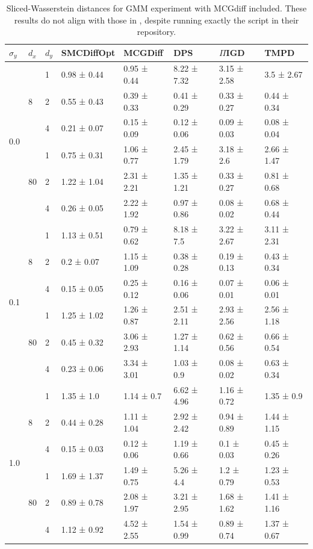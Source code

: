\begin{table}[ht]
    \centering
    \begin{tabular}{llllllll}
        \toprule
        $\sigma_y$ & $d_x$ & $d_y$ & SMCDiffOpt & MCGDiff & DPS & $\Pi$IGD & TMPD \\
        \midrule
        \multirow[t]{6}{*}{0.0} & \multirow[t]{3}{*}{8} & 1 & 0.98 ± 0.44 & 0.95 ± 0.44 & 8.22 ± 7.32 & 3.15 ± 2.58 & 3.5 ± 2.67 \\
         &  & 2 & 0.55 ± 0.43 & 0.39 ± 0.33 & 0.41 ± 0.29 & 0.33 ± 0.27 & 0.44 ± 0.34 \\
         &  & 4 & 0.21 ± 0.07 & 0.15 ± 0.09 & 0.12 ± 0.06 & 0.09 ± 0.03 & 0.08 ± 0.04 \\
        \cline{2-8}
         & \multirow[t]{3}{*}{80} & 1 & 0.75 ± 0.31 & 1.06 ± 0.77 & 2.45 ± 1.79 & 3.18 ± 2.6 & 2.66 ± 1.47 \\
         &  & 2 & 1.22 ± 1.04 & 2.31 ± 2.21 & 1.35 ± 1.21 & 0.33 ± 0.27 & 0.81 ± 0.68 \\
         &  & 4 & 0.26 ± 0.05 & 2.22 ± 1.92 & 0.97 ± 0.86 & 0.08 ± 0.02 & 0.68 ± 0.44 \\
        \cline{1-8} \cline{2-8}
        \multirow[t]{6}{*}{0.1} & \multirow[t]{3}{*}{8} & 1 & 1.13 ± 0.51 & 0.79 ± 0.62 & 8.18 ± 7.5 & 3.22 ± 2.67 & 3.11 ± 2.31 \\
         &  & 2 & 0.2 ± 0.07 & 1.15 ± 1.09 & 0.38 ± 0.28 & 0.19 ± 0.13 & 0.43 ± 0.34 \\
         &  & 4 & 0.15 ± 0.05 & 0.25 ± 0.12 & 0.16 ± 0.06 & 0.07 ± 0.01 & 0.06 ± 0.01 \\
        \cline{2-8}
         & \multirow[t]{3}{*}{80} & 1 & 1.25 ± 1.02 & 1.26 ± 0.87 & 2.51 ± 2.11 & 2.93 ± 2.56 & 2.56 ± 1.18 \\
         &  & 2 & 0.45 ± 0.32 & 3.06 ± 2.93 & 1.27 ± 1.14 & 0.62 ± 0.56 & 0.66 ± 0.54 \\
         &  & 4 & 0.23 ± 0.06 & 3.34 ± 3.01 & 1.03 ± 0.9 & 0.08 ± 0.02 & 0.63 ± 0.34 \\
        \cline{1-8} \cline{2-8}
        \multirow[t]{6}{*}{1.0} & \multirow[t]{3}{*}{8} & 1 & 1.35 ± 1.0 & 1.14 ± 0.7 & 6.62 ± 4.96 & 1.16 ± 0.72 & 1.35 ± 0.9 \\
         &  & 2 & 0.44 ± 0.28 & 1.11 ± 1.04 & 2.92 ± 2.42 & 0.94 ± 0.89 & 1.44 ± 1.15 \\
         &  & 4 & 0.15 ± 0.03 & 0.12 ± 0.06 & 1.19 ± 0.66 & 0.1 ± 0.03 & 0.45 ± 0.26 \\
        \cline{2-8}
         & \multirow[t]{3}{*}{80} & 1 & 1.69 ± 1.37 & 1.49 ± 0.75 & 5.26 ± 4.4 & 1.2 ± 0.79 & 1.23 ± 0.53 \\
         &  & 2 & 0.89 ± 0.78 & 2.08 ± 1.97 & 3.21 ± 2.95 & 1.68 ± 1.62 & 1.41 ± 1.16 \\
         &  & 4 & 1.12 ± 0.92 & 4.52 ± 2.55 & 1.54 ± 0.99 & 0.89 ± 0.74 & 1.37 ± 0.67 \\
        \cline{1-8} \cline{2-8}
        \bottomrule
    \end{tabular}
    \caption{Sliced-Wasserstein distances for GMM experiment with MCGdiff included. These results
    do not align with those in \textcite{cardosoMonteCarloGuided2023}, despite running exactly
    the script in their repository.}
    \label{tab:gmm-mcg}
\end{table}

